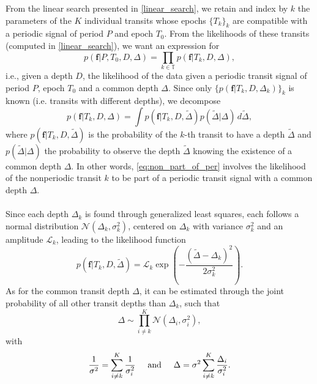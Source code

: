 \documentclass[modern,linenumbers]{aastex631}
\begin{document}
\newcommand{\sumTk}{i\neq k}
From the linear search presented in \autoref{linear_search}, we retain and index by $k$ the parameters of the $K$ individual transits whose epochs $\{T_k\}_k$ are compatible with a periodic signal of period $P$ and epoch $T_0$. From the likelihoods of these transits (computed in \autoref{linear_search}), we want an expression for
\begin{equation*}
    p(\bm{f} \vert P, T_0 ,D, \Delta) = \prod_{k\in\mathbb{T}} p(\bm{f} \vert T_k, D, \Delta),
\end{equation*}
i.e., given a depth $D$, the likelihood of the data given a periodic transit signal of period $P$, epoch $T_0$ and a common depth $\Delta$. Since only $\{p(\bm{f} \vert T_k, D, \Delta_k)\}_{k}$ is known (i.e. transits with different depths), we decompose
\begin{equation}\label{eq:non_part_of_per}
    p(\bm{f} \vert T_k, D, \Delta) = \int p(\bm{f} \vert T_k, D, \tilde\Delta)p(\tilde\Delta | \Delta)\, d\tilde\Delta,
\end{equation}
where $p(\bm{f} \vert T_k, D, \tilde\Delta)$ is the probability of the $k$-th transit to have a depth $\tilde\Delta$ and $p(\tilde\Delta | \Delta)$ the probability to observe the depth $\tilde\Delta$ knowing the existence of a common depth $\Delta$. In other words, \autoref{eq:non_part_of_per} involves the likelihood of the nonperiodic transit $k$ to be part of a periodic transit signal with a common depth $\Delta$.
\\\\
Since each depth $\Delta_k$ is found through generalized least squares, each follows a normal distribution $\mathcal{N}(\Delta_k, \sigma_k^2)$, centered on $\Delta_k$ with variance $\sigma_k^2$ and an amplitude $\mathcal{L}_k$, leading to the likelihood function
\begin{equation*}
    p(\bm{f} \vert T_k, D, \tilde\Delta) = \mathcal{L}_k\exp \left(-\frac{(\tilde\Delta-\Delta_k)^2}{2\sigma_k^2}\right).
\end{equation*}
As for the common transit depth $\Delta$, it can be estimated through the joint probability of all other transit depths than $\Delta_k$, such that
\begin{equation*}
    \Delta \sim \prod_{\sumTk}^K \mathcal{N}(\Delta_i, \sigma_i^2),
\end{equation*}
with 
\begin{equation}\label{eq:params}
\frac{1}{\sigma^2} = \sum_{\sumTk}^K \frac{1}{\sigma_i^2} \hspace{0.5cm} \text{and} \hspace{0.5cm}
\Delta =\sigma^2 \sum_{\sumTk}^K {\frac{\Delta_i}{\sigma_i^2}}.
\end{equation}
\end{document}
